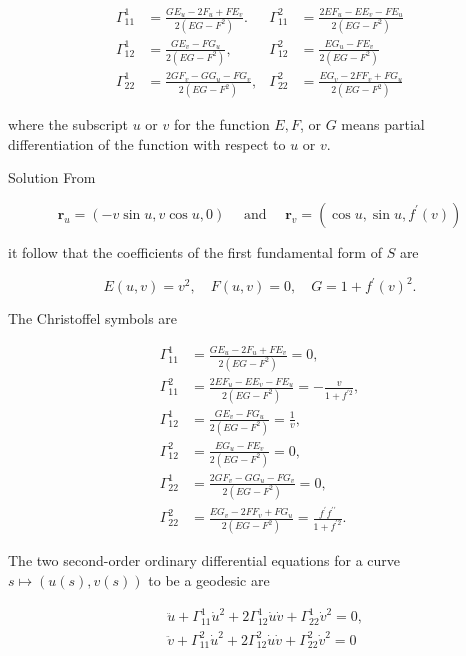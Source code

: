\documentclass[10pt]{article}
\begin{document}
$$
\begin{aligned}
\Gamma_{11}^{1} & =\frac{G E_{u}-2 F_{u}+F E_{v}}{2\left(E G-F^{2}\right)} . & \Gamma_{11}^{2} & =\frac{2 E F_{u}-E E_{v}-F E_{u}}{2\left(E G-F^{2}\right)} \\
\Gamma_{12}^{1} & =\frac{G E_{v}-F G_{u}}{2\left(E G-F^{2}\right)}, & \Gamma_{12}^{2} & =\frac{E G_{u}-F E_{v}}{2\left(E G-F^{2}\right)} \\
\Gamma_{22}^{1} & =\frac{2 G F_{v}-G G_{u}-F G_{v}}{2\left(E G-F^{2}\right)}, & \Gamma_{22}^{2} & =\frac{E G_{v}-2 F F_{v}+F G_{u}}{2\left(E G-F^{2}\right)}
\end{aligned}
$$

where the subscript $u$ or $v$ for the function $E, F$, or $G$ means partial differentiation of the function with respect to $u$ or $v$.

Solution From

$$
\mathbf{r}_{u}=(-v \sin u, v \cos u, 0) \quad \text { and } \quad \mathbf{r}_{v}=\left(\cos u, \sin u, f^{\prime}(v)\right)
$$

it follow that the coefficients of the first fundamental form of $S$ are

$$
E(u, v)=v^{2}, \quad F(u, v)=0, \quad G=1+f^{\prime}(v)^{2} .
$$

The Christoffel symbols are

$$
\begin{aligned}
\Gamma_{11}^{1} & =\frac{G E_{u}-2 F_{u}+F E_{v}}{2\left(E G-F^{2}\right)}=0, \\
\Gamma_{11}^{2} & =\frac{2 E F_{u}-E E_{v}-F E_{u}}{2\left(E G-F^{2}\right)}=-\frac{v}{1+f^{\prime 2}}, \\
\Gamma_{12}^{1} & =\frac{G E_{v}-F G_{u}}{2\left(E G-F^{2}\right)}=\frac{1}{v}, \\
\Gamma_{12}^{2} & =\frac{E G_{u}-F E_{v}}{2\left(E G-F^{2}\right)}=0, \\
\Gamma_{22}^{1} & =\frac{2 G F_{v}-G G_{u}-F G_{v}}{2\left(E G-F^{2}\right)}=0, \\
\Gamma_{22}^{2} & =\frac{E G_{v}-2 F F_{v}+F G_{u}}{2\left(E G-F^{2}\right)}=\frac{f^{\prime} f^{\prime \prime}}{1+f^{\prime 2}} .
\end{aligned}
$$

The two second-order ordinary differential equations for a curve $s \mapsto(u(s), v(s))$ to be a geodesic are

$$
\begin{aligned}
& \ddot{u}+\Gamma_{11}^{1} \dot{u}^{2}+2 \Gamma_{12}^{1} \dot{u} \dot{v}+\Gamma_{22}^{1} \dot{v}^{2}=0, \\
& \ddot{v}+\Gamma_{11}^{2} \dot{u}^{2}+2 \Gamma_{12}^{2} \dot{u} \dot{v}+\Gamma_{22}^{2} \dot{v}^{2}=0
\end{aligned}
$$
\end{document}
